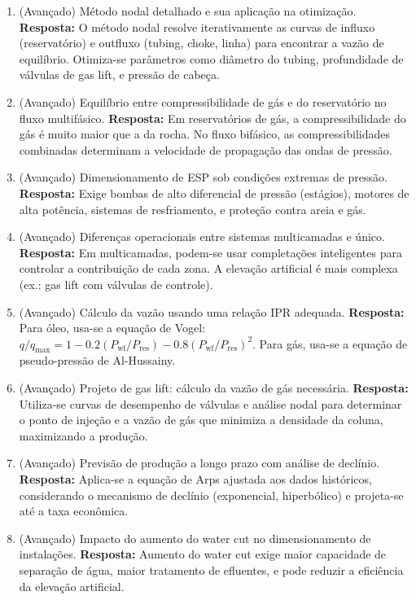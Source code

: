 \documentclass[11pt,a4paper]{article}
\begin{document}
\begin{enumerate}
  \item (Avançado) Método nodal detalhado e sua aplicação na otimização.
  \textbf{Resposta:} O método nodal resolve iterativamente as curvas de influxo (reservatório) e outfluxo (tubing, choke, linha) para encontrar a vazão de equilíbrio. Otimiza-se parâmetros como diâmetro do tubing, profundidade de válvulas de gas lift, e pressão de cabeça.

  \item (Avançado) Equilíbrio entre compressibilidade de gás e do reservatório no fluxo multifásico.
  \textbf{Resposta:} Em reservatórios de gás, a compressibilidade do gás é muito maior que a da rocha. No fluxo bifásico, as compressibilidades combinadas determinam a velocidade de propagação das ondas de pressão.

  \item (Avançado) Dimensionamento de ESP sob condições extremas de pressão.
  \textbf{Resposta:} Exige bombas de alto diferencial de pressão (estágios), motores de alta potência, sistemas de resfriamento, e proteção contra areia e gás.

  \item (Avançado) Diferenças operacionais entre sistemas multicamadas e único.
  \textbf{Resposta:} Em multicamadas, podem-se usar completações inteligentes para controlar a contribuição de cada zona. A elevação artificial é mais complexa (ex.: gas lift com válvulas de controle).

  \item (Avançado) Cálculo da vazão usando uma relação IPR adequada.
  \textbf{Resposta:} Para óleo, usa-se a equação de Vogel: $q / q_{\max} = 1 - 0.2(P_{\text{wf}}/P_{\text{res}}) - 0.8(P_{\text{wf}}/P_{\text{res}})^2$. Para gás, usa-se a equação de pseudo-pressão de Al-Hussainy.

  \item (Avançado) Projeto de gas lift: cálculo da vazão de gás necessária.
  \textbf{Resposta:} Utiliza-se curvas de desempenho de válvulas e análise nodal para determinar o ponto de injeção e a vazão de gás que minimiza a densidade da coluna, maximizando a produção.

  \item (Avançado) Previsão de produção a longo prazo com análise de declínio.
  \textbf{Resposta:} Aplica-se a equação de Arps ajustada aos dados históricos, considerando o mecanismo de declínio (exponencial, hiperbólico) e projeta-se até a taxa econômica.

  \item (Avançado) Impacto do aumento do water cut no dimensionamento de instalações.
  \textbf{Resposta:} Aumento do water cut exige maior capacidade de separação de água, maior tratamento de efluentes, e pode reduzir a eficiência da elevação artificial.


\end{enumerate}
\end{document}
